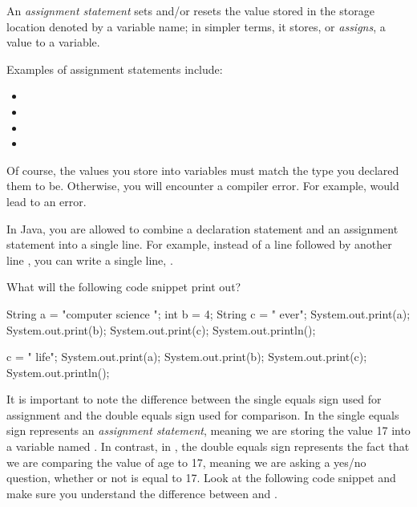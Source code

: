 \begin{definition}
An \emph{assignment statement} sets and/or resets the value stored in the storage location denoted by a variable name; in simpler terms, it stores, or \emph{assigns}, a value to a variable.
\end{definition}

\noindent Examples of assignment statements include:
\begin{itemize}
 \item {}
 \item {}
 \item {}
 \item {}
\end{itemize}
Of course, the values you store into variables must match the type you declared them to be. Otherwise, you will encounter a compiler error. For example,  would lead to an error.

In Java, you are allowed to combine a declaration statement and an assignment statement into a single line. For example, instead of a line  followed by another line , you can write a single line, .

\begin{exercise}
  What will the following code snippet print out?
  \begin{code}
    String a = "computer  science ";
    int b = 4;
    String c = " ever";
    System.out.print(a);
    System.out.print(b);
    System.out.print(c);
    System.out.println();

    c = " life";
    System.out.print(a);
    System.out.print(b);
    System.out.print(c);
    System.out.println();
  \end{code}
\end{exercise}

It is important to note the difference between the single equals sign used for assignment and the double equals sign used for comparison. In  the single equals sign represents an \emph{assignment statement}, meaning we are storing the value 17 into a variable named . In contrast, in , the double equals sign represents the fact that we are comparing the value of age to 17, meaning we are asking a yes/no question, whether or not  is equal to 17. Look at the following code snippet and make sure you understand the difference between \ic{=} and \ic{==}.

